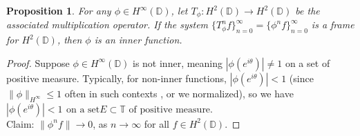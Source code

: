 \documentclass[12pt,titlepage]{amsart}
\newtheorem{prop}[thm]{Proposition}
\theoremstyle{definition}
\theoremstyle{remark}
\begin{document}
\begin{prop} \label{Prop.1}
For any $\phi \in H^{\infty}(\mathbb{D})$, let $T_{\phi}:
H^2(\mathbb{D})\rightarrow H^2(\mathbb{D})$ be the associated
multiplication operator. If the system
$\{T_{\phi}^nf\}_{n=0}^{\infty}=\{ \phi^n f \}_{n=0}^\infty $ is a
frame for $H^2(\mathbb{D})$, then $\phi$ is an inner function.
\end{prop}
\begin{proof}
Suppose $\phi \in H^\infty(\mathbb{D})$ is not inner, meaning
$|\phi(e^{i\theta})|\neq 1$ on a set of positive measure.
Typically, for non-inner functions, $|\phi(e^{i\theta})|<1$ (since
$\|\phi\|_{H^{\infty}}\leq 1$ often in such contexts , or we
normalized), so we have $|\phi(e^{i\theta})|<1 \,\ \text{on a set
} E
\subset \mathbb{T} \text{ of positive measure}$.\\
Claim: $\|\phi ^n f\| \rightarrow 0$, as $n \rightarrow \infty$
for all $f \in H^2(\mathbb{D})$.


\end{proof}
\end{document}

